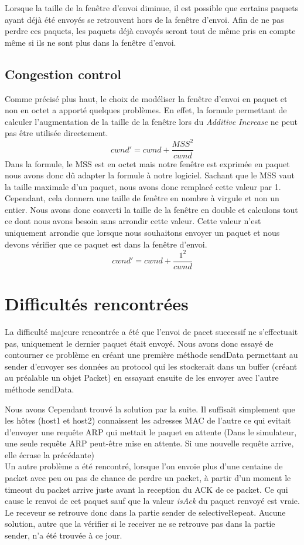 \documentclass{article}
\begin{document}
Lorsque la taille de la fenêtre d'envoi diminue, il est possible que certains paquets ayant déjà été envoyés se retrouvent hors de la fenêtre d'envoi.
Afin de ne pas perdre ces paquets, les paquets déjà envoyés seront tout de même pris en compte même si ils ne sont plus dans la fenêtre d'envoi.


\subsection{Congestion control}
Comme précisé plus haut, le choix de modéliser la fenêtre d'envoi en paquet et non en octet a apporté quelques problèmes.
En effet, la formule permettant de calculer l'augmentation de la taille de la fenêtre lors du \textit{Additive Increase}
ne peut pas être utilisée directement.
\[
    cwnd' = cwnd + \frac{MSS^2}{cwnd}
\]
Dans la formule, le MSS est en octet mais notre fenêtre est exprimée en paquet nous avons donc dû adapter la formule à notre logiciel.
Sachant que le MSS vaut la taille maximale d'un paquet, nous avons donc remplacé cette valeur par 1.
Cependant, cela donnera une taille de fenêtre en nombre à virgule et non un entier. Nous avons donc converti la taille de la fenêtre
en double et calculons tout ce dont nous avons besoin sans arrondir cette valeur.
Cette valeur n'est uniquement arrondie que lorsque nous souhaitons envoyer un paquet et nous devons vérifier que ce paquet est dans la fenêtre d'envoi.
\[
    cwnd' = cwnd + \frac{1^2}{cwnd}
\]  

\newpage

\section{Difficultés rencontrées}
La difficulté majeure rencontrée a été que l'envoi de pacet successif ne s'effectuait pas, uniquement le dernier paquet était envoyé.
Nous avons donc essayé de contourner ce problème en créant une première méthode sendData permettant au sender d'envoyer ses données au protocol
qui les stockerait dans un buffer (créant au préalable un objet Packet) en essayant ensuite de les envoyer avec l'autre méthode sendData.

Nous avons Cependant trouvé la solution par la suite. Il suffisait simplement que les hôtes (host1 et host2) connaissent
les adresses MAC de l'autre ce qui evitait d'envoyer une requête ARP qui mettait le paquet en attente (Dans le simulateur, une seule requête ARP peut-être mise en attente. Si une nouvelle requête arrive, elle écrase la précédante)
\vspace{0.5cm} \\
\indent Un autre problème a été rencontré, lorsque l'on envoie plus d'une centaine de packet avec peu ou pas de chance de perdre un packet, 
à partir d'un moment le timeout du packet arrive juste avant la reception du ACK de ce packet. 
Ce qui cause le renvoi de cet paquet sauf que la valeur \emph{isAck} du paquet renvoyé est vraie.
Le receveur se retrouve donc dans la partie sender de selectiveRepeat. 
Aucune solution, autre que la vérifier si le receiver ne se retrouve pas dans la partie sender, n'a été trouvée à ce jour.
\end{document}

